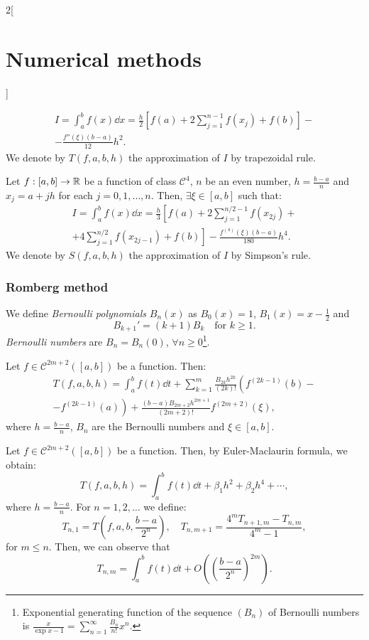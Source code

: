 \documentclass[../../../main.tex]{subfiles}
\begin{document}
\begin{multicols}{2}[\section{Numerical methods}]
\begin{theorem}
    \begin{multline*}
        I=\int_a^bf(x)\dd x=\frac{h}{2}\left[f(a)+2\sum_{j=1}^{n-1}f(x_j)+f(b)\right]-\\-\frac{f''(\xi)(b-a)}{12}h^2.
    \end{multline*}
    We denote by $T(f,a,b,h)$ the approximation of $I$ by trapezoidal rule.
\end{theorem}
\begin{theorem}
    Let $f:[a,b]\rightarrow\mathbb{R}$ be a function of class $\mathcal{C}^4$, $n$ be an even number, $h=\frac{b-a}{n}$ and $x_j=a+jh$ for each $j=0,1,\ldots,n$. Then, $\exists\xi\in[a,b]$ such that:
    \begin{multline*}
        I=\int_a^bf(x)\dd x=\frac{h}{3}\left[f(a)+2\sum_{j=1}^{n/2-1}f(x_{2j})\right.+\\+\left.4\sum_{j=1}^{n/2}f(x_{2j-1})+f(b)\right]-\frac{f^{(4)}(\xi)(b-a)}{180}h^4.
    \end{multline*}
    We denote by $S(f,a,b,h)$ the approximation of $I$ by Simpson's rule.
\end{theorem}
\subsubsection*{Romberg method}
\begin{definition}
    We define \textit{Bernoulli polynomials} $B_n(x)$ as $B_0(x)=1$, $B_1(x)=x-\frac{1}{2}$ and $$B_{k+1}'=(k+1)B_k\quad\text{for }k\geq 1.$$ \textit{Bernoulli numbers} are $B_n=B_n(0)$, $\forall n\geq 0$\footnote{Exponential generating function of the sequence $(B_n)$ of Bernoulli numbers is $\displaystyle\frac{x}{\exp{x}-1}=\sum_{n=1}^\infty\frac{B_n}{n!}x^n$.}.
\end{definition}
\begin{theorem}
    Let $f\in\mathcal{C}^{2m+2}([a,b])$ be a function. Then:
    \begin{multline*}
        T(f,a,b,h)=\int_a^bf(t)\dd t+\sum_{k=1}^m\frac{B_{2k}h^{2k}}{(2k)!}\left(f^{(2k-1)}(b)\right.-\\-\left.f^{(2k-1)}(a)\right)+\frac{(b-a)B_{2m+2}h^{2m+1}}{(2m+2)!}f^{(2m+2)}(\xi),
    \end{multline*}
    where $h=\frac{b-a}{n}$, $B_n$ are the Bernoulli numbers and $\xi\in[a,b]$.
\end{theorem}
\begin{theorem}
    Let $f\in\mathcal{C}^{2m+2}([a,b])$ be a function. Then, by Euler-Maclaurin formula, we obtain: $$T(f,a,b,h)=\int_a^bf(t)\dd t+\beta_1 h^2+\beta_2 h^4+\cdots,$$ where $h=\frac{b-a}{n}$. For $n=1,2,\ldots$ we define: $$T_{n,1}=T\left(f,a,b,\frac{b-a}{2^n}\right),\quad T_{n,m+1}=\frac{4^mT_{n+1,m}-T_{n,m}}{4^m-1},$$ for $m\leq n$. Then, we can observe that $$T_{n,m}=\int_a^bf(t)\dd t+O\left(\left(\frac{b-a}{2^n}\right)^{2m}\right).$$
\end{theorem}

\end{multicols}
\end{document}
